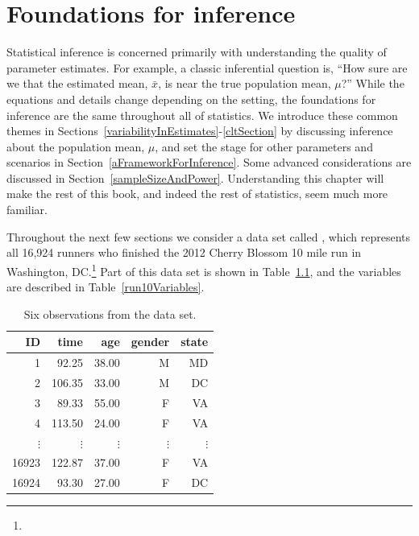 \chapter{Foundations for inference}
\label{foundationsForInference}

Statistical inference is concerned primarily with understanding the quality of parameter estimates. For example, a classic inferential question is, ``How sure are we that the estimated mean, $\bar{x}$, is near the true population mean, $\mu$?'' While the equations and details change depending on the setting, the foundations for inference are the same throughout all of statistics. We introduce these common themes in Sections~\ref{variabilityInEstimates}-\ref{cltSection} by discussing inference about the population mean, $\mu$, and set the stage for other parameters and scenarios in Section~\ref{aFrameworkForInference}. Some advanced considerations are discussed in Section~\ref{sampleSizeAndPower}. Understanding this chapter will make the rest of this book, and indeed the rest of statistics, seem much more familiar.


Throughout the next few sections we consider a data set called , which represents all 16,924 runners who finished the 2012 Cherry Blossom 10 mile run in Washington, DC.\footnote{} Part of this data set is shown in Table~\ref{run10DF}, and the variables are described in Table~\ref{run10Variables}.

\begin{table}[h]
\centering
\begin{tabular}{rrrrr}
  \hline
ID & time & age & gender & state \\ 
  \hline
1 & 92.25 & 38.00 & M & MD \\ 
2 & 106.35 & 33.00 & M & DC \\ 
3 & 89.33 & 55.00 & F & VA \\ 
4 & 113.50 & 24.00 & F & VA \\ 
$\vdots$ & $\vdots$ & $\vdots$ & $\vdots$ & $\vdots$ \\
16923 & 122.87 & 37.00 & F & VA \\ 
16924 & 93.30 & 27.00 & F & DC \\ 
   \hline
\end{tabular}
\caption{Six observations from the  data set.}
\label{run10DF}
\end{table}

